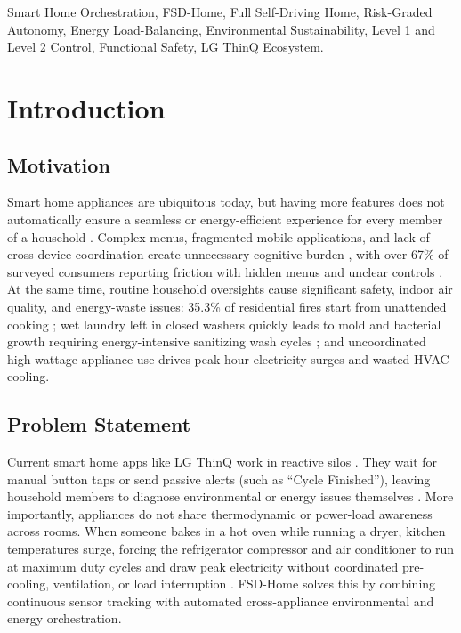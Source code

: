 \documentclass[conference]{IEEEtran}
\begin{document}
\begin{IEEEkeywords}
Smart Home Orchestration, FSD-Home, Full Self-Driving Home, Risk-Graded Autonomy, Energy Load-Balancing, Environmental Sustainability, Level 1 and Level 2 Control, Functional Safety, LG ThinQ Ecosystem.
\end{IEEEkeywords}

\section{Introduction}

\subsection{Motivation}
Smart home appliances are ubiquitous today, but having more features does not automatically ensure a seamless or energy-efficient experience for every member of a household \cite{msit2026}. Complex menus, fragmented mobile applications, and lack of cross-device coordination create unnecessary cognitive burden \cite{moneytoday2026}, with over 67\% of surveyed consumers reporting friction with hidden menus and unclear controls \cite{maeil2026}. At the same time, routine household oversights cause significant safety, indoor air quality, and energy-waste issues: 35.3\% of residential fires start from unattended cooking \cite{seoulfire2020, nfa2025}; wet laundry left in closed washers quickly leads to mold and bacterial growth requiring energy-intensive sanitizing wash cycles \cite{epa2022, who2009}; and uncoordinated high-wattage appliance use drives peak-hour electricity surges and wasted HVAC cooling.

\subsection{Problem Statement}
Current smart home apps like LG ThinQ work in reactive silos \cite{lgspec2026}. They wait for manual button taps or send passive alerts (such as ``Cycle Finished''), leaving household members to diagnose environmental or energy issues themselves \cite{pradhan2020}. More importantly, appliances do not share thermodynamic or power-load awareness across rooms. When someone bakes in a hot oven while running a dryer, kitchen temperatures surge, forcing the refrigerator compressor and air conditioner to run at maximum duty cycles and draw peak electricity without coordinated pre-cooling, ventilation, or load interruption \cite{ashrae2023}. FSD-Home solves this by combining continuous sensor tracking with automated cross-appliance environmental and energy orchestration.
\end{document}
